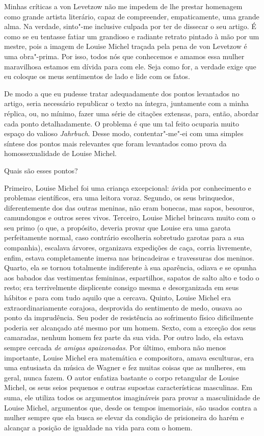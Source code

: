 Minhas críticas a von Levetzow não me impedem de lhe prestar homenagem
como grande artista literário, capaz de compreender, empaticamente, uma
grande alma. Na verdade, sinto"-me inclusive culpada por ter de dissecar
o seu artigo. É como se eu tentasse fatiar um grandioso e radiante
retrato pintado à mão por um mestre, pois a imagem de Louise Michel
traçada pela pena de von Levetzow é uma obra"-prima. Por isso, todos nós
que conhecemos e amamos essa mulher maravilhosa estamos em dívida para com
ele. Seja como for, a verdade exige que eu coloque os meus sentimentos
de lado e lide com os fatos.

De modo a que eu pudesse tratar adequadamente dos pontos levantados no
artigo, seria necessário republicar o texto na íntegra, juntamente com a
minha réplica, ou, no mínimo, fazer uma série de citações extensas,
para, então, abordar cada ponto detalhadamente. O problema é que um tal
feito ocuparia muito espaço do valioso \textit{Jahrbuch}. Desse modo,
contentar"-me"-ei com uma simples síntese dos pontos mais relevantes que
foram levantados como prova da homossexualidade de Louise Michel.

Quais são esses pontos?

Primeiro, Louise Michel foi uma criança excepcional: ávida por
conhecimento e problemas científicos, era uma leitora voraz. Segundo, os
seus brinquedos, diferentemente dos das outras meninas, não eram
bonecas, mas sapos, besouros, camundongos e outros seres vivos.
Terceiro, Louise Michel brincava muito com o seu primo (o que, a
propósito, deveria provar que Louise era uma garota perfeitamente
normal, caso contrário escolheria sobretudo garotas para a sua
companhia), escalava árvores, organizava expedições de caça, corria
livremente, enfim, estava completamente imersa nas brincadeiras e
travessuras dos meninos. Quarto, ela se tornou totalmente indiferente à
sua aparência, odiava e se opunha aos babados das vestimentas femininas,
espartilhos, sapatos de salto alto e todo o resto; era terrivelmente
displicente consigo mesma e desorganizada em seus hábitos e para com
tudo aquilo que a cercava. Quinto, Louise Michel era extraordinariamente
corajosa, desprovida do sentimento de medo, ousava ao ponto da
imprudência. Seu poder de resistência ao sofrimento físico dificilmente
poderia ser alcançado até mesmo por um homem. Sexto, com a exceção dos seus
camaradas, nenhum homem fez parte da sua vida. Por outro lado, ela
estava sempre cercada \textit{de amigas apaixonadas}. Por último, embora não
menos importante, Louise Michel era matemática e compositora, amava
esculturas, era uma entusiasta da música de Wagner e fez muitas coisas
que as mulheres, em geral, nunca fazem. O autor enfatiza bastante o
corpo retangular de Louise Michel, os seus seios pequenos e outras
supostas características masculinas. Em suma, ele utiliza todos os
argumentos imagináveis ​​para provar a masculinidade de Louise Michel,
argumentos que, desde os tempos imemoriais, são usados contra a mulher
sempre que ela busca se elevar da condição de prisioneira do harém e
alcançar a posição de igualdade na vida para com o homem.

